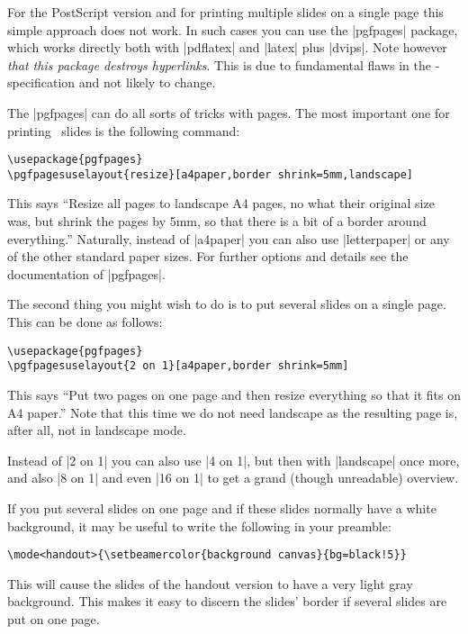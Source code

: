 For the PostScript version and for printing multiple slides on a single page this simple approach does not work. In such cases you can use the |pgfpages| package, which works directly both with |pdflatex| and |latex| plus |dvips|. Note however \emph{that this package destroys hyperlinks}. This is due to fundamental flaws in the \pdf-specification and not likely to change.

The |pgfpages| can do all sorts of tricks with pages. The most important one for printing \beamer\ slides is the following command:
\begin{verbatim}
\usepackage{pgfpages}
\pgfpagesuselayout{resize}[a4paper,border shrink=5mm,landscape]
\end{verbatim}

This says ``Resize all pages to landscape A4 pages, no what their original size was, but shrink the pages by 5mm, so that there is a bit of a border around everything.'' Naturally, instead of |a4paper| you can also use |letterpaper| or any of the other standard paper sizes. For further options and details see the documentation of |pgfpages|.

The second thing you might wish to do is to put several slides on a single page. This can be done as follows:
\begin{verbatim}
\usepackage{pgfpages}
\pgfpagesuselayout{2 on 1}[a4paper,border shrink=5mm]
\end{verbatim}

This says ``Put two pages on one page and then resize everything so that it fits on A4 paper.'' Note that this time we do not need landscape as the resulting page is, after all, not in landscape mode.

Instead of |2 on 1| you can also use |4 on 1|, but then with |landscape| once more, and also |8 on 1| and even |16 on 1| to get a grand (though unreadable) overview.

If you put several slides on one page and if these slides normally have a white background, it may be useful to write the following in your preamble:
\begin{verbatim}
\mode<handout>{\setbeamercolor{background canvas}{bg=black!5}}
\end{verbatim}

This will cause the slides of the handout version to have a very light gray background. This makes it easy to discern the slides' border if several slides are put on one page.


